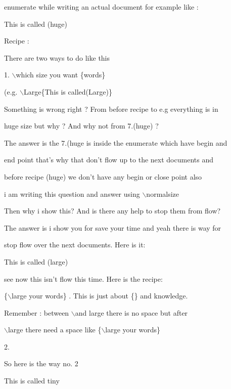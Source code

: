 \documentclass[11pt]{article}
\begin{document}
  enumerate while writing an actual document for example like :
  
  \huge{This is called (huge)}

Recipe :

There are two ways to do like this

1. $\backslash$which size you want \{words\}

(e.g. $\backslash$Large\{This is called(Large)\}

\vspace{1cm}

\normalsize Something is wrong right ? From before recipe to e.g everything is in 

huge size but why ? And why not from 7.(huge) ?

The answer is the 7.(huge is inside the enumerate which have begin and

end point that's why that don't flow up to the next documents and

before recipe (huge) we don't have any begin or close point also

i am writing this question and answer using $\backslash$normalsize

\vspace{1cm}

Then why i show this? And is there any help to stop them from flow?

The answer is i show you for save your time and yeah there is way for

stop flow over the next documents. Here is it:

\vspace{1cm}

{\large This is called (large)}

\vspace{1cm}

see now this isn't flow this time. Here is the recipe:

\{$\backslash$large your words\}  . This is just about \{\} and knowledge.

Remember : between $\backslash$and large there is no space but after 

$\backslash$large there need a space like \{$\backslash$large your words\}

\pagebreak

{\large 2.}

So here is the way no. 2

\begin{tiny}
This is called tiny
\end{tiny}
\end{document}

